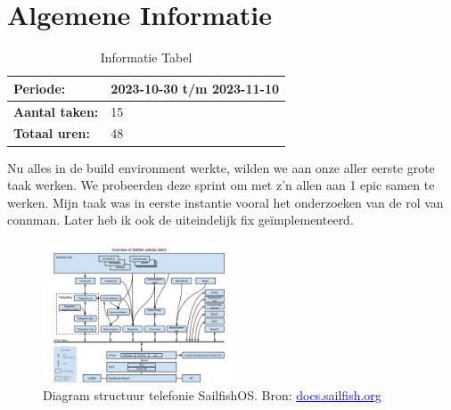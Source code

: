 \documentclass[a4paper]{report}
\newcommand{\styledhref}[2]{%
    \href{#1}{\textcolor{blue}{\underline{#2}}} %
}
\begin{document}
\section{Algemene Informatie}
\begin{table}[H]
  \begin{tabularx}{0.6\textwidth}{|X|X|}
    \hline
    \cellcolor[HTML]{99ccff} \textbf{Periode:} & 2023-10-30 t/m 2023-11-10 \\ 
    \hline
    \cellcolor[HTML]{99ccff} \textbf{Aantal taken:} & 15 \\ 
    \hline
    \cellcolor[HTML]{99ccff} \textbf{Totaal uren:} & 48 \\ 
    \hline
  \end{tabularx}
  \caption{Informatie Tabel}
  \label{table:it4:general}
  \end{table}

Nu alles in de build environment werkte, wilden we aan onze aller eerste grote taak werken.
We probeerden deze sprint om met z'n allen aan 1 epic samen te werken.
Mijn taak was in eerste instantie vooral het onderzoeken van de rol van connman.
Later heb ik ook de uiteindelijk fix geïmplementeerd.  

\begin{figure}[ht]
  \centering
  \includegraphics[width=0.5\textwidth]{Images/cellulardiagram}
  \caption{Diagram structuur telefonie SailfishOS. Bron: \styledhref{https://docs.sailfishos.org/Reference/Core_Areas_and_APIs/Networking/Cellular_Telephony_Architecture/}{docs.sailfish.org}}
  \label{fig:cellulardiagram}
  \end{figure}
  
\end{document}
